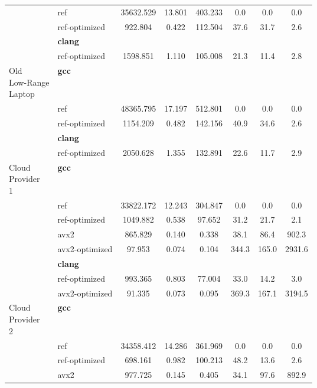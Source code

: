 \begin{table}
\begin{tabularx}{\linewidth}{l l c c c c c c}
          & ref & 35632.529 & 13.801 & 403.233 & 0.0 & 0.0 & 0.0\\
          & ref-optimized & 922.804 & 0.422 & 112.504 & 37.6 & 31.7 & 2.6\\
          & \textbf{clang} & & & & & \\
          & ref-optimized & 1598.851 & 1.110 & 105.008 & 21.3 & 11.4 & 2.8\\
          \midrule
          \multirowcell{5}{Old\\ Low-Range\\ Laptop}
          & \textbf{gcc} & & & & & \\
          & ref & 48365.795 & 17.197 & 512.801 & 0.0 & 0.0 & 0.0\\
          & ref-optimized & 1154.209 & 0.482 & 142.156 & 40.9 & 34.6 & 2.6\\
          & \textbf{clang} & & & & & \\
          & ref-optimized & 2050.628 & 1.355 & 132.891 & 22.6 & 11.7 & 2.9\\
          \midrule
          \multirowcell{8}{Cloud\\ Provider\\ 1}
          & \textbf{gcc} & & & & & \\
          & ref & 33822.172 & 12.243 & 304.847 & 0.0 & 0.0 & 0.0\\
          & ref-optimized & 1049.882 & 0.538 & 97.652 & 31.2 & 21.7 & 2.1\\
          & avx2 & 865.829 & 0.140 & 0.338 & 38.1 & 86.4 & 902.3\\
          & avx2-optimized & 97.953 & 0.074 & 0.104 & 344.3 & 165.0 & 2931.6\\
          & \textbf{clang} & & & & & \\
          & ref-optimized & 993.365 & 0.803 & 77.004 & 33.0 & 14.2 & 3.0\\
          & avx2-optimized & 91.335 & 0.073 & 0.095 & 369.3 & 167.1 & 3194.5\\
          \midrule
          \multirowcell{8}{Cloud\\ Provider\\ 2}
          & \textbf{gcc} & & & & & \\
          & ref & 34358.412 & 14.286 & 361.969 & 0.0 & 0.0 & 0.0\\
          & ref-optimized & 698.161 & 0.982 & 100.213 & 48.2 & 13.6 & 2.6\\
          & avx2 & 977.725 & 0.145 & 0.405 & 34.1 & 97.6 & 892.9\\

\end{tabularx}
\end{table}
